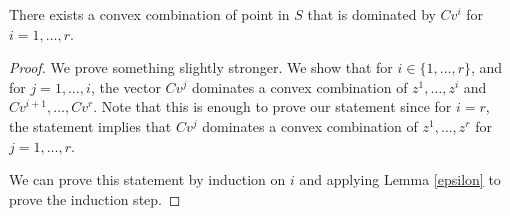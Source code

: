 \begin{lemma}\label{tightcutcomb}
	There exists a convex combination of point in $S$ that is dominated by $Cv^i$ for $i=1,\ldots,r$.
\end{lemma}
\begin{proof}
	
	We prove something slightly stronger. We show that for $i\in\{1,\ldots,r\}$, and for $j=1,\ldots,i$, the vector $Cv^j$ dominates  a convex combination of $z^1,\ldots,z^i$ and $Cv^{i+1},\ldots,Cv^r$. Note that this is enough to prove our statement since for $i=r$, the statement implies that $Cv^j$ dominates a convex combination of $z^1,\ldots,z^r$ for $j=1,\ldots,r$. 
	
	We can prove this statement by induction on $i$ and applying Lemma \ref{epsilon} to prove the induction step.
\end{proof}

